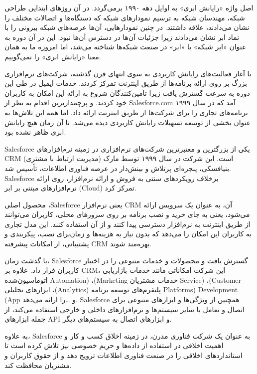 \documentclass{book}
\begin{document}
            اصل واژه «رایانش ابری» به اوایل دهه ۱۹۹۰ برمی‌گردد. در آن روزهای ابتدایی طراحی شبکه، مهندسان شبکه به ترسیم نمودارهای شبکه که دستگاه‌ها و اتصالات مختلف را نشان می‌دادند، علاقه داشتند. در چنین نمودارهایی، آن‌ها عرصه‌های شبکه بیرونی را با نماد ابر نشان می‌دادند زیرا جزئیات آن‌ها در دسترس آن‌ها نبود. این در آن دوره به عنوان «ابر شبکه» یا «ابر» در صنعت شبکه‌ها شناخته می‌شد، اما امروزه ما به همان معنا «رایانش ابری» را نمی‌گوییم.

            با آغاز فعالیت‌های رایانش کاربردی به سوی انتهای قرن گذشته، شرکت‌های نرم‌افزاری بزرگ بر روی ارائه برنامه‌ها از طریق اینترنت تمرکز کردند. خدمات ایمیل در طی این دوره به سرعت گسترش یافت زیرا تامین‌کنندگان شروع به ارائه این امکان به کاربران خود کردند. و پرچمدارترین اقدام به نظر از Salesforce.com آمد که در سال ۱۹۹۹ برنامه‌های تجاری را برای شرکت‌ها از طریق اینترنت ارائه داد. اما همه این تلاش‌ها به عنوان بخشی از توسعه تسهیلات رایانش کاربردی دیده می‌شد. تا آن زمان هیچ رایانش ابری ظاهر نشده بود.

            \begin{addinfo2}

                Salesforce یکی از بزرگترین و معتبرترین شرکت‌های نرم‌افزاری در زمینه نرم‌افزارهای CRM (مدیریت ارتباط با مشتری) است. این شرکت در سال ۱۹۹۹ توسط مارک بنیافسکی، پنجره‌ای پرتلاش و بینش‌دار در عرصه فناوری اطلاعات، تأسیس شد. Salesforce برخلاف رویکردهای سنتی به فروش و ارائه نرم‌افزار، روی ارائه نرم‌افزارهای مبتنی بر ابر (Cloud) تمرکز کرد.

                محصول اصلی ،Salesforce یعنی نرم‌افزار CRM آن، به عنوان یک سرویس ارائه می‌شود، یعنی به جای خرید و نصب برنامه بر روی سرورهای محلی، کاربران می‌توانند از طریق اینترنت به نرم‌افزار دسترسی پیدا کنند و از آن استفاده کنند. این مدل تجاری به کاربران این امکان را می‌دهد که بدون نیاز به هزینه‌ها و زمان‌برای نصب، پیکربندی و پشتیبانی، از امکانات پیشرفته CRM بهره‌مند شوند.

                با گذشت زمان، Salesforce گسترش یافت و محصولات و خدمات متنوعی را در اختیار کاربران قرار داد. علاوه بر CRM، این شرکت امکاناتی مانند خدمات بازاریابی اتوماسیون‌شده Automation) ،(Marketing خدمات مشتریان Service) ،(Customer ابزارهای تحلیلی ،(Analytics) پلتفرم‌های توسعه برنامه Platforms) Development (App و \dots را ارائه می‌دهد. Salesforce همچنین از ویژگی‌ها و ابزارهای متنوعی برای اتصال و تعامل با سایر سیستم‌ها و نرم‌افزارهای داخلی و خارجی استفاده می‌کند، از جمله ابزارهای API و ابزارهای اتصال به سیستم‌های دیگر.

                به علاوه، Salesforce به عنوان یک شرکت فناوری مدرن، در زمینه اخلاق کسب و کار و اهمیت اخلاقی در استفاده از داده‌ها و حریم خصوصی نیز تلاش کرده است تا استانداردهای اخلاقی را در صنعت فناوری اطلاعات ترویج دهد و از حقوق کاربران و مشتریان محافظت کند.

            \end{addinfo2}
\end{document}
